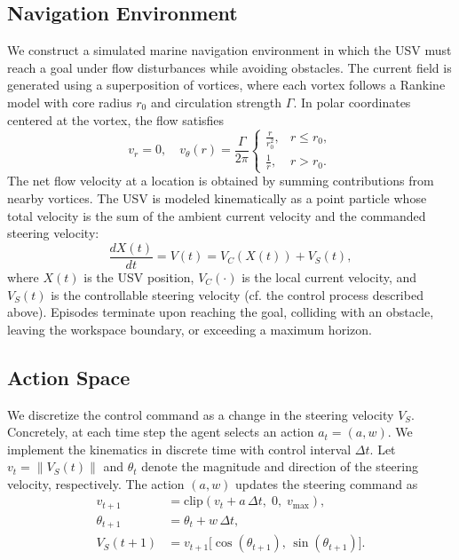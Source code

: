 \documentclass[runningheads]{llncs}
\begin{document}
\subsection{Navigation Environment}
\label{sec:method_env}
We construct a simulated marine navigation environment in which the USV must reach a goal under flow disturbances while avoiding obstacles. The current field is generated using a superposition of vortices, where each vortex follows a Rankine model with core radius $r_0$ and circulation strength $\Gamma$. In polar coordinates centered at the vortex, the flow satisfies
\begin{equation}
v_r = 0,\quad
v_{\theta}(r)=\frac{\Gamma}{2\pi}
\begin{cases}
\frac{r}{r_0^2}, & r \le r_0,\\
\frac{1}{r}, & r > r_0.
\end{cases}
\label{eq:rankine}
\end{equation}
The net flow velocity at a location is obtained by summing contributions from nearby vortices. The USV is modeled kinematically as a point particle whose total velocity is the sum of the ambient current velocity and the commanded steering velocity:
\begin{equation}
\frac{dX(t)}{dt}=V(t)=V_C(X(t)) + V_S(t),
\label{eq:kinematics}
\end{equation}
where $X(t)$ is the USV position, $V_C(\cdot)$ is the local current velocity, and $V_S(t)$ is the controllable steering velocity (cf. the control process described above).
Episodes terminate upon reaching the goal, colliding with an obstacle, leaving the workspace boundary, or exceeding a maximum horizon.

\subsection{Action Space}
\label{sec:method_action}

We discretize the control command as a change in the steering velocity $V_S$. Concretely, at each time step the agent selects an action $a_t=(a,w)$.
We implement the kinematics in discrete time with control interval $\Delta t$. Let $v_t=\|V_S(t)\|$ and $\theta_t$ denote the magnitude and direction of the steering velocity, respectively. The action $(a,w)$ updates the steering command as
\begin{align}
v_{t+1} &= \mathrm{clip}\!\left(v_t + a\,\Delta t,\; 0,\; v_{\max}\right), \label{eq:vs_update_v}\\
\theta_{t+1} &= \theta_t + w\,\Delta t, \label{eq:vs_update_theta}\\
V_S(t+1) &= v_{t+1}\big[\cos(\theta_{t+1}),\,\sin(\theta_{t+1})\big]. \label{eq:vs_update_vec}
\end{align}
\end{document}
